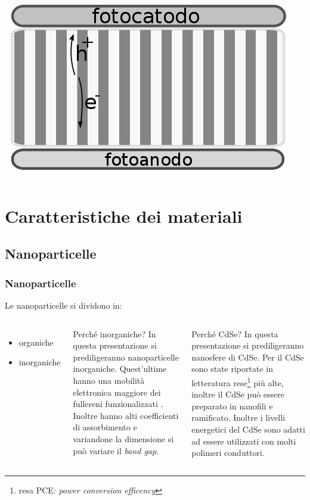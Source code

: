 \documentclass{beamer}
\begin{document}
\begin{frame}
\begin{columns}
	 \includegraphics[scale=0.185]{immagini/aggregati_allineati.png}
      \end{columns}
    \end{frame}


\section{Caratteristiche dei materiali}\subsection{Nanoparticelle}

    \begin{frame}
      \frametitle{
      Nanoparticelle}
      Le nanoparticelle si dividono in:
      \begin{columns}
	  \begin{itemize}
	    \item organiche
	    \item inorganiche
	  \end{itemize}\pause
	  \begin{block}{Perché inorganiche?}
	  In questa presentazione si prediligeranno nanoparticelle inorganiche. Quest'ultime hanno una \alert{mobilità elettronica} maggiore dei fullereni funzionalizzati \citep{fv-CdSe-OA}. Inoltre hanno alti coefficienti di assorbimento e variandone la dimensione si può variare il \emph{band gap}. 
	  \end{block}\pause
      \begin{block}{Perché CdSe?}
	In questa presentazione si prediligeranno nanosfere di CdSe. Per il CdSe sono state riportate in letteratura rese\footnote{resa PCE: \emph{power conversion efficency}} più alte, inoltre il CdSe può essere preparato in nanofili e ramificato. Inoltre i livelli energetici del CdSe sono adatti ad essere utilizzati con molti polimeri conduttori.
      \end{block}
      \end{columns}   
    \end{frame}
\end{document}
